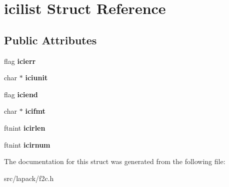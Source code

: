 \hypertarget{structicilist}{\section{icilist \-Struct \-Reference}
\label{structicilist}
}
\subsection*{\-Public \-Attributes}
\begin{DoxyCompactItemize}
\item 
\hypertarget{structicilist_aee2f6c57bb6df08adfc9d62a185f999a}{flag {\bfseries icierr}}\label{structicilist_aee2f6c57bb6df08adfc9d62a185f999a}

\item 
\hypertarget{structicilist_a4da4c2525fa8e39989ddc28f99b86b13}{char $\ast$ {\bfseries iciunit}}\label{structicilist_a4da4c2525fa8e39989ddc28f99b86b13}

\item 
\hypertarget{structicilist_a598f4d4f880c560238c7a32f5dcb3e51}{flag {\bfseries iciend}}\label{structicilist_a598f4d4f880c560238c7a32f5dcb3e51}

\item 
\hypertarget{structicilist_a3689b68768a386cbcc460eb2632118e9}{char $\ast$ {\bfseries icifmt}}\label{structicilist_a3689b68768a386cbcc460eb2632118e9}

\item 
\hypertarget{structicilist_ac6025ddf8b1ade5cb73d607dd2d30501}{ftnint {\bfseries icirlen}}\label{structicilist_ac6025ddf8b1ade5cb73d607dd2d30501}

\item 
\hypertarget{structicilist_a6e4cb8719f1c76ee87273671448da892}{ftnint {\bfseries icirnum}}\label{structicilist_a6e4cb8719f1c76ee87273671448da892}

\end{DoxyCompactItemize}


\-The documentation for this struct was generated from the following file\-:\begin{DoxyCompactItemize}
\item 
src/lapack/f2c.\-h\end{DoxyCompactItemize}

